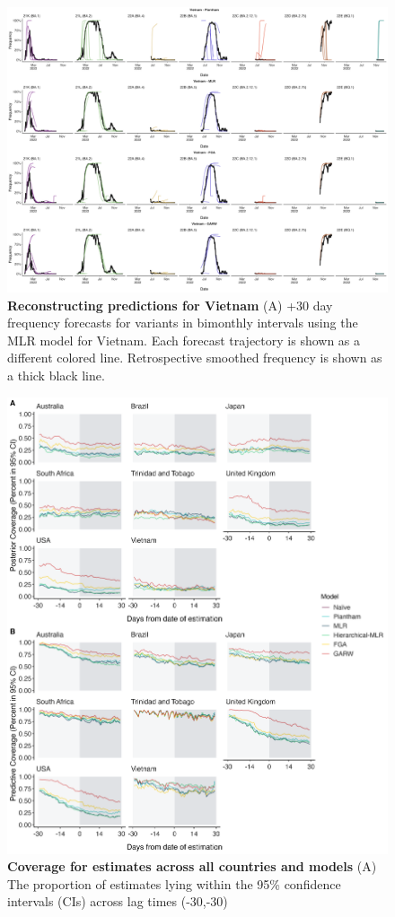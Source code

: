 \documentclass[11pt,oneside,letterpaper]{article}
\begin{document}
\begin{figure}[tb!]
	\centering
	\includegraphics[width=0.9\textwidth=0.01]{supp_figures/supplementary_fig_Vietnam.png}
	\caption{
		\textbf{Reconstructing predictions for Vietnam}
		(A) +30 day frequency forecasts for variants in bimonthly intervals using the MLR model for Vietnam.
		Each forecast trajectory is shown as a different colored line.
		Retrospective smoothed frequency is shown as a thick black line.
	}
	\label{fig:supplementary_fig_Vietnam}
\end{figure}


\begin{figure}[tb!]
	\centering
	\includegraphics[width=0.9\textwidth=0.01]{supp_figures/coverage_supp_2.png}
	\caption{
		\textbf{Coverage for estimates across all countries and models}
		(A) The proportion of estimates lying within the 95\% confidence intervals (CIs) across lag times (-30,-30)
	}
	\label{fig:frequency_coverage}
\end{figure}
\end{document}
